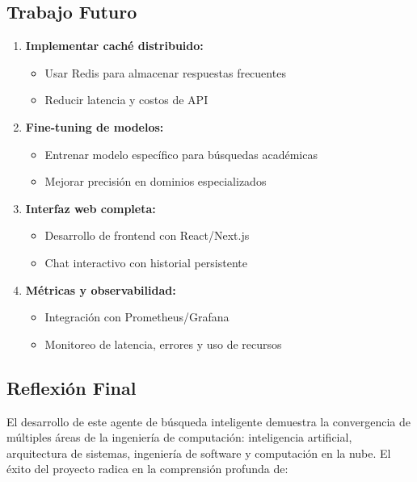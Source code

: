 \documentclass[12pt,a4paper]{article}
\begin{document}
\subsection{Trabajo Futuro}

\begin{enumerate}
    \item \textbf{Implementar caché distribuido:}
    \begin{itemize}
        \item Usar Redis para almacenar respuestas frecuentes
        \item Reducir latencia y costos de API
    \end{itemize}

    \item \textbf{Fine-tuning de modelos:}
    \begin{itemize}
        \item Entrenar modelo específico para búsquedas académicas
        \item Mejorar precisión en dominios especializados
    \end{itemize}

    \item \textbf{Interfaz web completa:}
    \begin{itemize}
        \item Desarrollo de frontend con React/Next.js
        \item Chat interactivo con historial persistente
    \end{itemize}

    \item \textbf{Métricas y observabilidad:}
    \begin{itemize}
        \item Integración con Prometheus/Grafana
        \item Monitoreo de latencia, errores y uso de recursos
    \end{itemize}
\end{enumerate}

\subsection{Reflexión Final}

El desarrollo de este agente de búsqueda inteligente demuestra la convergencia de múltiples áreas de la ingeniería de computación: inteligencia artificial, arquitectura de sistemas, ingeniería de software y computación en la nube. El éxito del proyecto radica en la comprensión profunda de:
\end{document}
